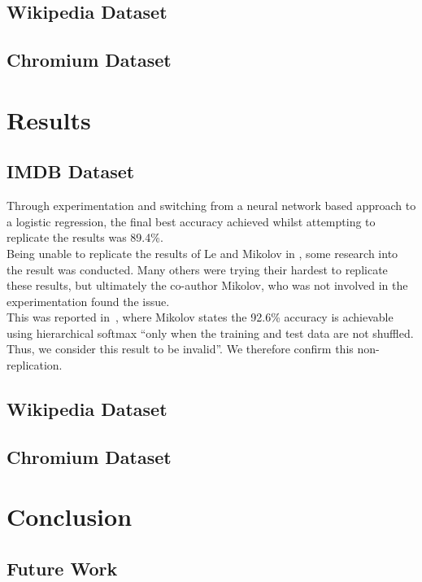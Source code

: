 \documentclass[11pt]{article}
\begin{document}
\subsection*{Wikipedia Dataset}

\subsection*{Chromium Dataset}


\section*{Results}

\subsection*{IMDB Dataset}
Through experimentation and switching from a neural network
based approach to a logistic regression, the final best accuracy
achieved whilst attempting to replicate the results was 89.4\%.\\
Being unable to replicate the results of Le and Mikolov in
\cite{le2014distributed}, some research into the result was
conducted. Many others were trying their hardest to replicate these
results, but ultimately the co-author Mikolov, who was not involved
in the experimentation found the issue.\\
This was reported in~\cite{mesnil2014ensemble}, where Mikolov
states the 92.6\% accuracy is achievable using hierarchical softmax
``only when the training and test data are not shuffled. Thus, we
consider this result to be invalid''. We therefore confirm this
non-replication.

\subsection*{Wikipedia Dataset}

\subsection*{Chromium Dataset}


\section*{Conclusion}


\subsection*{Future Work}

\printbibliography
\end{document}
